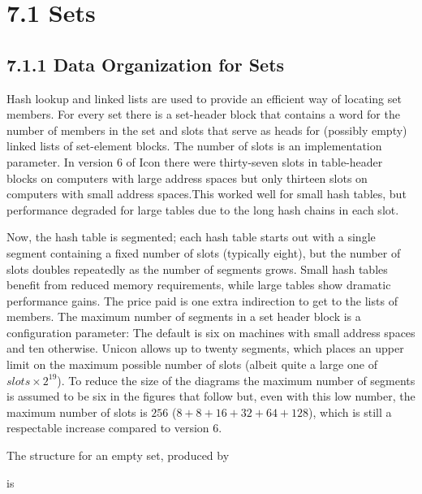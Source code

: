 \section[7.1 Sets]{7.1 Sets}
\subsection[7.1.1 Data Organization for Sets]{7.1.1 Data Organization for Sets}

Hash lookup and linked lists are used to provide an efficient way of
locating set members. For every set there is a set-header block that
contains a word for the number of members in the set and slots that
serve as heads for (possibly empty) linked lists of set-element
blocks. The number of slots is an implementation parameter. In version
6 of Icon there were thirty-seven slots in table-header blocks on
computers with large address spaces but only thirteen slots on
computers with small address spaces.This worked well for small hash
tables, but performance degraded for large tables due to the long hash
chains in each slot.  

Now, the hash table is segmented; each hash table starts out with a
single segment containing a fixed number of slots (typically eight),
but the number of slots doubles repeatedly as the number of segments
grows. Small hash tables benefit from reduced memory requirements,
while large tables show dramatic performance gains. The price paid is
one extra indirection to get to the lists of members. The maximum
number of segments in a set header block is a configuration parameter:
The default is six on machines with small address spaces and ten
otherwise.
{\color{blue} Unicon allows up to twenty segments, which places an
upper limit on the maximum possible number of slots (albeit quite a
large one of $slots \times 2^{19}$).
}
To reduce the size of the diagrams the maximum number of segments is
assumed to be six in the figures that follow but, even with this low
number, the maximum number of slots is $256$ ($8 + 8 + 16 + 32 + 64
+ 128$), which is still a respectable increase compared to version 6.

The structure for an empty set, produced by


\noindent is

